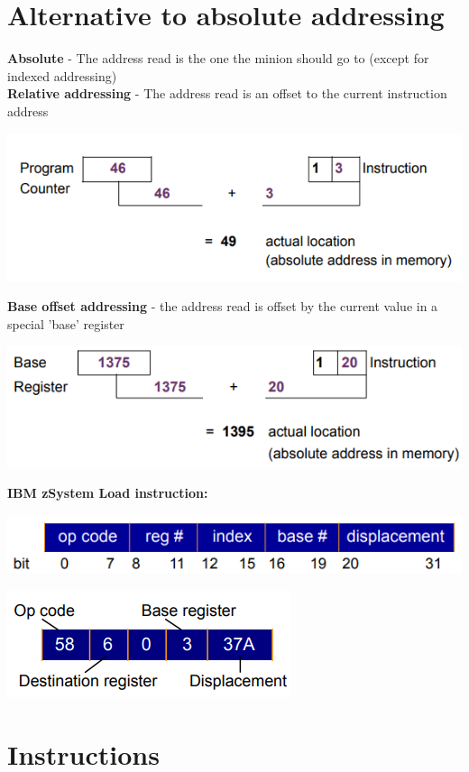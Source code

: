 \documentclass{article}[18pt]
\begin{document}
\section{Alternative to absolute addressing}
\textbf{Absolute} - The address read is the one the minion should go to (except for indexed addressing)\\
\textbf{Relative addressing} - The address read is an offset to the current instruction address
\begin{center}
	\includegraphics[scale=0.7]{alternative}
\end{center}
\textbf{Base offset addressing} - the address read is offset by the current value in a special 'base' register
\begin{center}
\includegraphics[width=0.7\linewidth]{alternative1}
\end{center}
\textbf{IBM zSystem Load instruction:}
\begin{center}
	\includegraphics[scale=0.7]{alternative2}
\end{center}
\begin{center}
	\includegraphics[scale=0.7]{alternative3}
\end{center}
\section{Instructions}
\end{document}
